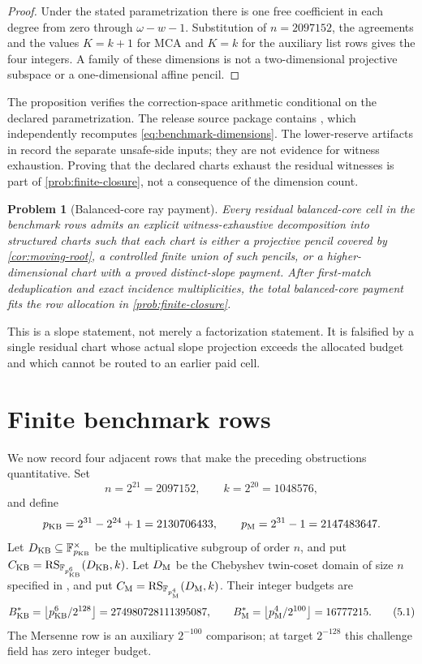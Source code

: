 \documentclass[a4paper,11pt]{amsart}
\newtheorem{problem}[theorem]{Problem}
\theoremstyle{remark}
\DeclareMathOperator{\RS}{RS}
\newcommand{\F}{\mathbb F}
\newcommand{\floor}[1]{\left\lfloor#1\right\rfloor}
\begin{document}
\begin{proof}
Under the stated parametrization there is one free coefficient in each degree from zero through
\(\omega-w-1\).  Substitution of \(n=2097152\), the agreements and the values
\(K=k+1\) for MCA and \(K=k\) for the auxiliary list rows gives the four
integers.  A family of these dimensions is not a two-dimensional projective
subspace or a one-dimensional affine pencil.
\end{proof}

The proposition verifies the correction-space arithmetic conditional on the
declared parametrization.  The release source package contains
, which independently recomputes
\eqref{eq:benchmark-dimensions}.  The lower-reserve artifacts in
\cite{RSMCARepo} record the separate unsafe-side inputs; they are not evidence
for witness exhaustion.  Proving that the declared charts exhaust the
residual witnesses is part of \cref{prob:finite-closure}, not a consequence
of the dimension count.

\begin{problem}[Balanced-core ray payment]\label{prob:balanced-core}
Every residual balanced-core cell in the benchmark rows admits an explicit
witness-exhaustive decomposition into structured charts such that each chart
is either a projective pencil covered by \cref{cor:moving-root}, a controlled
finite union of such pencils, or a higher-dimensional chart with a proved
distinct-slope payment.  After first-match deduplication and exact incidence
multiplicities, the total balanced-core payment fits the row allocation in
\cref{prob:finite-closure}.
\end{problem}

This is a slope statement, not merely a factorization statement.  It is
falsified by a single residual chart whose actual slope projection exceeds
the allocated budget and which cannot be routed to an earlier paid cell.

\section{Finite benchmark rows}\label{sec:finite}

We now record four adjacent rows that make the preceding obstructions
quantitative.  Set
\[
 n=2^{21}=2097152,\qquad k=2^{20}=1048576,
\]
and define
\[
 p_{\rm KB}=2^{31}-2^{24}+1=2130706433,
 \qquad p_{\rm M}=2^{31}-1=2147483647.
\]
Let \(D_{\rm KB}\subseteq\F_{p_{\rm KB}}^\times\) be the multiplicative
subgroup of order \(n\), and put
\(C_{\rm KB}=\RS_{\F_{p_{\rm KB}^6}}(D_{\rm KB},k)\).  Let \(D_{\rm M}\)
be the Chebyshev twin-coset domain of size \(n\) specified in
\cite{ChoShortening,RSMCARepo}, and put
\(C_{\rm M}=\RS_{\F_{p_{\rm M}^4}}(D_{\rm M},k)\).  Their integer budgets are
\[
 B_{\rm KB}^*=\floor{p_{\rm KB}^6/2^{128}}
 =274980728111395087,\qquad
 B_{\rm M}^*=\floor{p_{\rm M}^4/2^{100}}=16777215. \tag{5.1}\label{eq:budgets}
\]
The Mersenne row is an auxiliary \(2^{-100}\) comparison; at target
\(2^{-128}\) this challenge field has zero integer budget.
\end{document}
